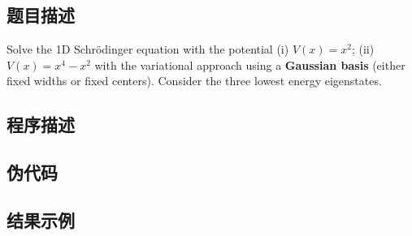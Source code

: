 \subsection{题目描述}
Solve the 1D Schrödinger equation with the potential (i) \( V(x) = x^2 \); (ii) \( V(x) = x^4 - x^2 \) with the variational approach using a \textbf{Gaussian basis} (either fixed widths or fixed centers). Consider the three lowest energy eigenstates.

\subsection{程序描述}

\subsection{伪代码}

\subsection{结果示例}
